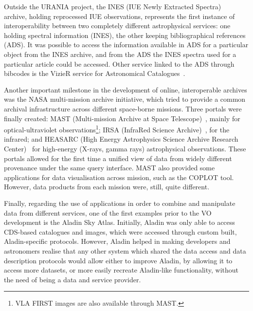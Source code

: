 \newcommand{\vizierurl}[0]
{http://webviz.u-strasbg.fr/viz-bin/VizieR}
Outside the URANIA project, the
INES (IUE Newly Extracted
Spectra)~\cite{1999A&AS..139..183R} archive, holding reprocessed IUE
observations, represents the first instance of interoperability between
two completely different astrophysical services: one holding spectral
information (INES), the other keeping bibliographical references (ADS).
It was possible to access the information available in ADS for a
particular object from the INES archive, and from the ADS the INES
spectra used for a particular article could be accessed. Other service
linked to the ADS through bibcodes is the VizieR\urlnote{\vizierurl}
service for Astronomical Catalogues~\cite{2000A&AS..143...23O}.

Another important milestone in the development of online, interoperable
archives was the NASA multi-mission archive initiative, which tried to
provide a common archival infrastructure across different space-borne
missions. Three portals were finally created:
MAST (Multi-mission Archive at Space
Telescope)~\cite{1999AAS...194.8302I}, mainly for optical-ultraviolet
observations\footnote{VLA FIRST images are also available through
MAST.}; IRSA (InfraRed Science
Archive)~\cite{2000AAS...19711610B}, for the infrared; and
HEASARC (High Energy
Astrophysics Science Archive Research
Center)~\cite{1994BAAS...26..995R} for high-energy (X-rays, gamma rays)
astrophysical observations. These portals allowed for the first time a
unified view of data from widely different provenance under the same
query interface. MAST also provided some applications for data
visualisation across mission, such as the
COPLOT tool.
However, data products from each mission were, still, quite different.

Finally, regarding the use of applications in order to combine and
manipulate data from different services, one of the first examples
prior to the VO development is the Aladin Sky Atlas. Initially, Aladin
was only able to access CDS-based catalogues and images, which were
accessed through custom built, Aladin-specific protocols. However,
Aladin helped in making developers and astronomers realise that any
other system which shared the data access and data description
protocols would allow either to improve Aladin, by allowing it to
access more datasets, or more easily recreate Aladin-like functionality, without the need of being a data and service provider.